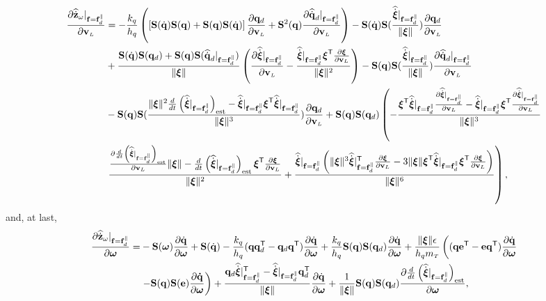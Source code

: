 \documentclass[journal,onecolumn]{IEEEtran}
\begin{document}
    \begin{align}
        \frac{\partial\zwdothat|_{\f=\fd^{\|}}}{\partial\vL}&=-\frac{k_q}{h_q}\left(\LSB\Skew{\dirdot}\Skew{\dir}+\Skew{\dir}\Skew{\dirdot}\RSB\frac{\partial\dird}{\partial\vL}
        +\Skew[2]{\dir}\frac{\partial\qddothat|_{\f=\fd^{\|}}}{\partial\vL}\right)-\Skew{\dirdot}\Skew{\frac{\widehat{\dot{\Xiq}}|_{\f=\fd^{\|}}}{\|\Xiq\|}}\frac{\partial\dird}{\partial\vL} \nonumber\\
        &
        +\frac{\Skew{\dirdot}\Skew{\dird}+\Skew{\dir}\Skew{\qddothat|_{\f=\f_d^{\|}}}}{\|\Xiq\|}\LP\frac{\partial\widehat{\dot{\Xiq}}|_{\f=\fd^{\|}}}{\partial\vL}-\frac{\widehat{\dot{\Xiq}}|_{\f=\fd^{\|}}\Xiq[T]\frac{\partial\Xiq}{\partial\vL}}{\|\Xiq\|^2}\RP -\Skew{\dir}\Skew{\frac{\widehat{\dot{\Xiq}}|_{\f=\fd^{\|}}}{\|\Xiq\|}} \frac{\partial\qddothat|_{\f=\fd^{\|}}}{\partial\vL}\nonumber\\
        &
        -\Skew{\dir}\Skew{\frac{\|\Xiq\|^2\frac{d}{dt}\LP\widehat{\dot{\Xiq}}|_{\f=\fd^{\|}}\RP_{\text{est}}-\widehat{\dot{\Xiq}}|_{\f=\fd^{\|}}\Xiq[T]\widehat{\dot{\Xiq}}|_{\f=\fd^{\|}}}{\|\Xiq\|^3}}\frac{\partial\dird}{\partial\vL} +\Skew{\dir}\Skew{\dird}\left(-\frac{\Xiq[T]\widehat{\dot{\Xiq}}|_{\f=\fd^{\|}}\frac{\partial\widehat{\dot{\Xiq}}|_{\f=\fd^{\|}}}{\partial\vL}-
        \widehat{\dot{\Xiq}}|_{\f=\fd^{\|}}\Xiq[T]\frac{\partial\widehat{\dot{\Xiq}}|_{\f=\fd^{\|}}}{\partial\vL}}{\|\Xiq\|^3}\right.\nonumber\\
        &
        \left.\frac{\frac{\partial\frac{d}{dt}\LP\widehat{\dot{\Xiq}}|_{\f=\fd^{\|}}\RP_{\text{est}}}{\partial\vL}\|\Xiq\|-\frac{d}{dt}\LP\widehat{\dot{\Xiq}}|_{\f=\fd^{\|}}\RP_{\text{est}}\Xiq[T]\frac{\partial\Xiq}{\partial\vL}}{\|\Xiq\|^2}
        +\frac{\widehat{\dot{\Xiq}}|_{\f=\fd^{\|}}\LP\|\Xiq\|^3\widehat{\dot{\Xiq}}|_{\f=\fd^{\|}}\trs\frac{\partial\Xiq}{\partial\vL}-3\|\Xiq\|\Xiq[T]\widehat{\dot{\Xiq}}|_{\f=\fd^{\|}}\Xiq[T]\frac{\partial\Xiq}{\partial\vL}\RP}{\|\Xiq\|^6}\right),
    \end{align}
	and, at last,
    \begin{align}
        \frac{\partial\zwdothat|_{\f=\fd^{\|}}}{\partial\wL}=&-\Skew{\wL}\frac{\partial\dirdot}{\partial\wL}+\Skew{\dirdot}-\frac{k_q}{h_q}(\dir\dird[T]-\dird\dir[T])\frac{\partial\dirdot}{\partial\wL}
        +\frac{k_q}{h_q}\Skew{\dir}\Skew{\dird}\frac{\partial\dirdot}{\partial\wL} + \frac{\|\Xiq\|\epsilon}{h_{q}\mT}\left((\dir{\bf e}\trs-{\bf e}\dir[T])\frac{\partial\dirdot}{\partial\wL}\right. \nonumber\\
        &\left.-\Skew{\dir}\Skew{\bf e}\frac{\partial\dirdot}{\partial\wL}\right)+\frac{\dird\widehat{\dot{\Xiq}}|_{\f=\fd^{\|}}\trs-\widehat{\dot{\Xiq}}|_{\f=\fd^{\|}}\dird[T]}{\|\Xiq\|}\frac{\partial\dirdot}{\partial\wL}
        +\frac{1}{\|\Xiq\|}\Skew{\dir}\Skew{\dird}\frac{\partial\frac{d}{dt}\LP\widehat{\dot{\Xiq}}|_{\f=\fd^{\|}}\RP_{\text{est}}}{\partial\wL},
    \end{align}
	
\end{document}
